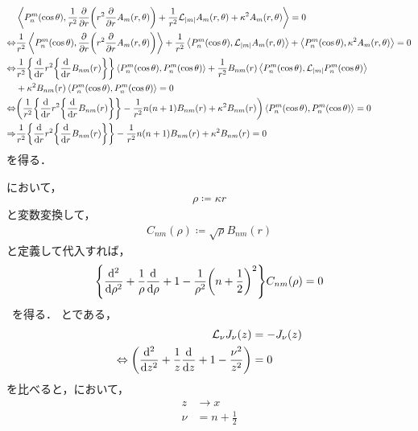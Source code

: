 \documentclass{report}
\begin{document}
    \begin{align}
      & \left\langle P_n^{m}(\cos\theta), \frac{1}{r^2}\pdv{r}\qty(r^2\pdv{r}A_m(r, \theta)) + \frac{1}{r^2}\mathcal{L}_{\abs{m}}A_m(r, \theta) + \kappa^2 A_m(r, \theta) \right\rangle = 0 \\ 
      \Leftrightarrow & \frac{1}{r^2}\left\langle P_n^{m}(\cos\theta), \pdv{r}\qty(r^2\pdv{r}A_m(r, \theta)) \right\rangle + \frac{1}{r^2}\left\langle P_n^{m}(\cos\theta), \mathcal{L}_{\abs{m}}A_m(r, \theta) \right\rangle + \left\langle P_n^{m}(\cos\theta), \kappa^2 A_m(r, \theta) \right\rangle = 0 \\ 
      \Leftrightarrow & \frac{1}{r^2}\qty{\dv{r}r^2\qty{\dv{r}B_{nm}(r)}}\left\langle P_n^{m}(\cos\theta), P_n^{m}(\cos\theta) \right\rangle + \frac{1}{r^2}B_{nm}(r)\left\langle P_n^{m}(\cos\theta), \mathcal{L}_{\abs{m}}P_n^{m}(\cos\theta) \right\rangle \notag \\ 
      &+ \kappa^2B_{nm}(r)\left\langle P_n^{m}(\cos\theta), P_n^{m}(\cos\theta) \right\rangle = 0 \\ 
      \Leftrightarrow&  \qty(\frac{1}{r^2}\qty{\dv{r}r^2\qty{\dv{r}B_{nm}(r)}} - \frac{1}{r^2}n(n + 1)B_{nm}(r) + \kappa^2 B_{nm}(r))\left\langle P_n^{m}(\cos\theta), P_n^{m}(\cos\theta) \right\rangle = 0 \\ 
      \Rightarrow& \frac{1}{r^2}\qty{\dv{r}r^2\qty{\dv{r}B_{nm}(r)}} - \frac{1}{r^2}n(n + 1)B_{nm}(r) + \kappa^2 B_{nm}(r) = 0\label{bnm-condition}
    \end{align}
    を得る．
    \par
    において，
    \begin{align}
      \rho \coloneqq \kappa r\label{rho-def}
    \end{align}
    と変数変換して，
    \begin{align}
      C_{nm}(\rho) \coloneq \sqrt{\rho}B_{nm}(r)\label{cnm-def}
    \end{align}
    と定義して代入すれば，
    \begin{align}
      \qty{\dv[2]{\rho} + \frac{1}{\rho}\dv{\rho} + 1 - \frac{1}{\rho^2}\qty(n + \frac{1}{2})^2}C_{nm}(\rho) = 0\label{bessel-form-rho}
    \end{align}\
    を得る．
    とである，
    \begin{align}
      \mathcal{L}_{\nu}J_{\nu}(z) &= - J_{\nu}(z)  \\ 
      \Leftrightarrow \qty(\dv[2]{z} + \frac{1}{z}\dv{z} + 1 - \frac{\nu^2}{z^2}) &= 0 \label{bessel-differential-eq-sub-2}
    \end{align}
    を比べると，において，
    \begin{align}
      z &\to x \\ 
      \nu &= n + \frac{1}{2}
    \end{align}
\end{document}
